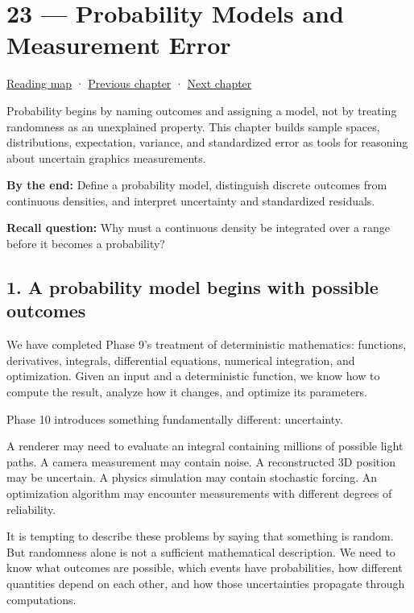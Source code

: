 \hypertarget{02-foundations-ii-ch023}{}
\section{23 --- Probability Models and Measurement Error}\label{probability-models-and-measurement-error}

\href{Chapter\%20Edition/01\%20-\%20Computing\%20Foundations/00\%20-\%20Reading\%20Map}{Reading map} · \hyperref[02-foundations-ii-ch022]{Previous chapter} · \hyperref[02-foundations-ii-ch024]{Next chapter}

Probability begins by naming outcomes and assigning a model, not by treating randomness as an unexplained property. This chapter builds sample spaces, distributions, expectation, variance, and standardized error as tools for reasoning about uncertain graphics measurements.

\textbf{By the end:} Define a probability model, distinguish discrete outcomes from continuous densities, and interpret uncertainty and standardized residuals.

\textbf{Recall question:} Why must a continuous density be integrated over a range before it becomes a probability?

\subsection{1. A probability model begins with possible outcomes}\label{a-probability-model-begins-with-possible-outcomes}

We have completed Phase 9's treatment of deterministic mathematics: functions, derivatives, integrals, differential equations, numerical integration, and optimization. Given an input and a deterministic function, we know how to compute the result, analyze how it changes, and optimize its parameters.

Phase 10 introduces something fundamentally different: uncertainty.

A renderer may need to evaluate an integral containing millions of possible light paths. A camera measurement may contain noise. A reconstructed 3D position may be uncertain. A physics simulation may contain stochastic forcing. An optimization algorithm may encounter measurements with different degrees of reliability.

It is tempting to describe these problems by saying that something is random. But randomness alone is not a sufficient mathematical description. We need to know what outcomes are possible, which events have probabilities, how different quantities depend on each other, and how those uncertainties propagate through computations.

